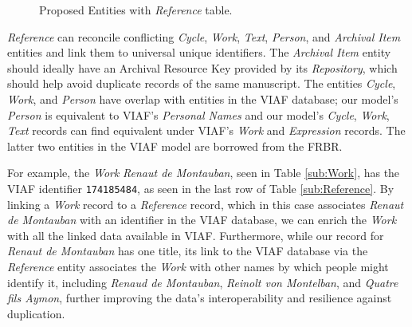 \begin{figure}[ht]
    \begin{center}
        
    \end{center}
\caption{Proposed Entities with \textit{Reference} table.}
\label{fig:ProposedEntitiesReference}
\end{figure}

\textit{Reference} can reconcile conflicting \textit{Cycle}, \textit{Work}, \textit{Text}, \textit{Person}, and \textit{Archival Item} entities and link them to universal unique identifiers. The \textit{Archival Item} entity should ideally have an Archival Resource Key provided by its \textit{Repository}, which should help avoid duplicate records of the same manuscript. The entities \textit{Cycle}, \textit{Work}, and \textit{Person} have overlap with entities in the VIAF database; our model's \textit{Person} is equivalent to VIAF's \textit{Personal Names} and our model's \textit{Cycle}, \textit{Work}, \textit{Text} records can find equivalent under VIAF's \textit{Work} and \textit{Expression} records. The latter two entities in the VIAF model are borrowed from the FRBR.

For example, the \textit{Work} \textit{Renaut de Montauban}, seen in Table \ref{sub:Work}, has the VIAF identifier {\texttt{174185484}}, as seen in the last row of Table \ref{sub:Reference}. By linking a \textit{Work} record to a \textit{Reference} record, which in this case associates \textit{Renaut de Montauban} with an identifier in the VIAF database, we can enrich the \textit{Work} with all the linked data available in VIAF. Furthermore, while our record for \textit{Renaut de Montauban} has one title, its link to the VIAF database via the \textit{Reference} entity associates the \textit{Work} with other names by which people might identify it, including \textit{Renaud de Montauban}, \textit{Reinolt von Montelban}, and \textit{Quatre fils Aymon}, further improving the data's interoperability and resilience against duplication.

